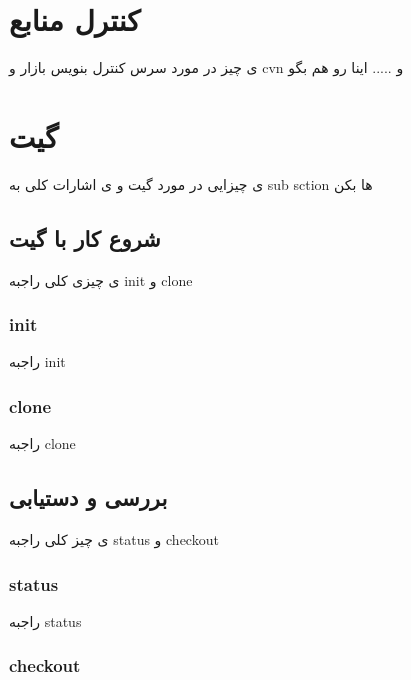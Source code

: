 \section{کنترل منابع }
ی چیز در مورد سرس کنترل بنویس بازار و cvn و ..... اینا رو هم بگو 



\section{گیت }
ی چیزایی در مورد گیت و ی اشارات کلی به sub sction ها بکن 
\subsection{شروع کار با گیت}
ی چیزی کلی راجبه init و clone 
\subsubsection{init}
راجبه init 
\subsubsection{clone}
راجبه clone
\subsection{بررسی و دستیابی}
ی چیز کلی راجبه status و checkout 
\subsubsection{status}
راجبه status 
\subsubsection{checkout}